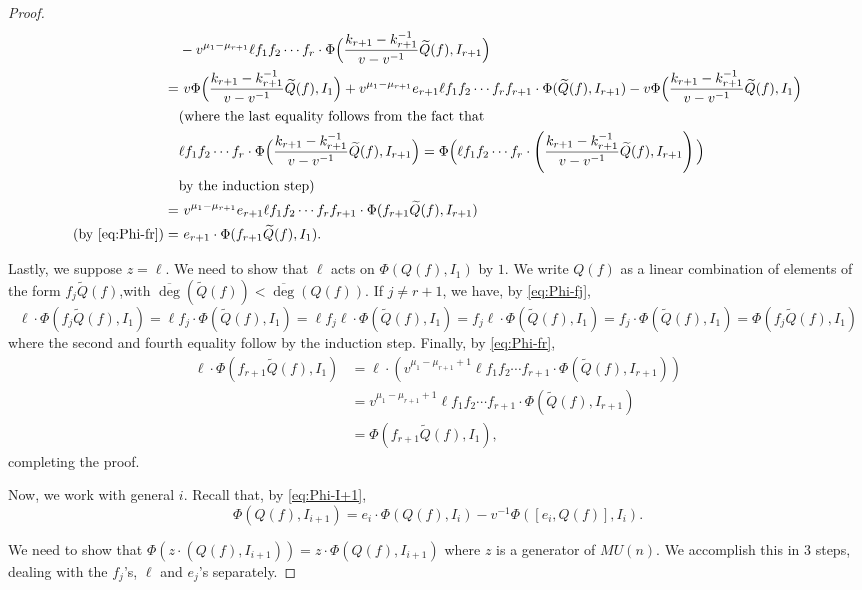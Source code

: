 \documentclass{amsart}
\numberwithin{equation}{section}
\theoremstyle{theorem}
\theoremstyle{definition}
\newcommand{\ol}{\overline}
\begin{document}
\begin{proof}
\begin{align*}
&-v^{\mu_1-\mu_{r+1}}\ell f_1f_2\cdots f_r \cdot\Phi\Big(\frac{k_{r+1}-k_{r+1}^{-1}}{v-v^{-1}}\widetilde{Q}(f),I_{r+1}\Big)\\
=&~v\Phi\Big(\frac{k_{r+1}-k_{r+1}^{-1}}{v-v^{-1}}\widetilde Q(f),I_1\Big) + v^{\mu_1-\mu_{r+1}}e_{r+1}\ell f_1f_2\cdots f_rf_{r+1}\cdot\Phi(\widetilde{Q}(f),I_{r+1}) -  v\Phi\Big(\frac{k_{r+1}-k_{r+1}^{-1}}{v-v^{-1}}\widetilde{Q}(f),I_{1}\Big)\\
&(\text{where the last equality follows from the fact that }\\
&\ell f_1f_2\cdots f_r \cdot\Phi\Big(\frac{k_{r+1}-k_{r+1}^{-1}}{v-v^{-1}}\widetilde{Q}(f),I_{r+1}\Big) = \Phi\Big(\ell f_1f_2\cdots f_r \cdot\left(\frac{k_{r+1}-k_{r+1}^{-1}}{v-v^{-1}}\widetilde{Q}(f),I_{r+1}\right)\Big)\\
&\text{by the induction step)}\\
=&~v^{\mu_1-\mu_{r+1}}e_{r+1}\ell f_1f_2\cdots f_rf_{r+1}\cdot\Phi(f_{r+1}\widetilde{Q}(f),I_{r+1})\\
\text{(by \eqref{eq:Phi-fr})}=&~e_{r+1}\cdot \Phi(f_{r+1}\widetilde{Q}(f),I_1).
\end{align*}

Lastly, we suppose $z=\ell$. We need to show that $\ell$ acts on $\Phi(Q(f), I_1)$ by $1$. We write $Q(f)$ as a linear combination of elements of the form $f_j\widetilde{Q}(f)$,with $\ol{\deg}(\widetilde{Q}(f))<\ol{\deg}(Q(f))$. If $j\neq r+1$, we have, by \eqref{eq:Phi-fj},
\[\ell\cdot \Phi(f_j\widetilde Q(f),I_1) =\ell f_j\cdot \Phi(\widetilde Q(f),I_1)= \ell f_j\ell\cdot \Phi(\widetilde Q(f),I_1) = f_j\ell\cdot \Phi(\widetilde Q(f),I_1)=f_j\cdot \Phi(\widetilde Q(f),I_1)=\Phi(f_j\widetilde Q(f),I_1)\]
where the second and fourth equality follow by the induction step.
Finally, by \eqref{eq:Phi-fr},
\begin{align*}
\ell\cdot \Phi(f_{r+1}\widetilde Q(f),I_1) &= \ell\cdot(v^{\mu_1-\mu_{r+1}+1}\ell f_1f_2\cdots f_{r+1} \cdot \Phi(\widetilde Q(f),I_{r+1}))\\
&= v^{\mu_1-\mu_{r+1}+1}\ell f_1f_2\cdots f_{r+1} \cdot \Phi(\widetilde Q(f),I_{r+1})\\
&= \Phi(f_{r+1}\widetilde Q(f),I_1),
\end{align*}completing the proof.

Now, we work with general $i$. Recall that, by \eqref{eq:Phi-I+1}, 
\[\Phi( Q(f),I_{i+1})=e_i\cdot \Phi( Q(f), I_i)-v^{-1}\Phi([e_i,Q(f)], I_{i}).\]

We need to show that $\Phi(z\cdot(Q(f), I_{i+1})) = z\cdot \Phi(Q(f), I_{i+1})$ where $z$ is a generator of $MU(n)$. We accomplish this in $3$ steps, dealing with the $f_j$'s, $\ell$ and $e_j$'s separately.


\end{proof}
\end{document}
